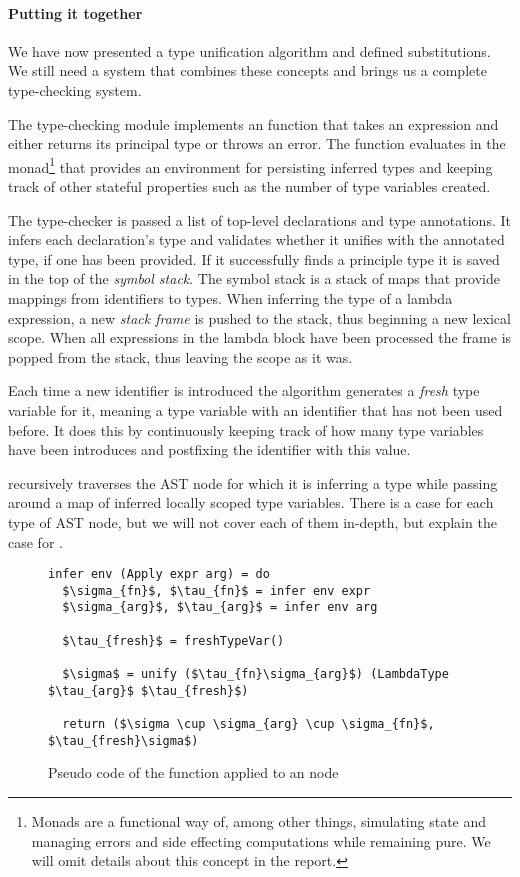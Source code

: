 \paragraph{Putting it together}
We have now presented a type unification algorithm and defined substitutions. We still need a system that combines these concepts and brings us a complete type-checking system.

The type-checking module  implements an  function that takes an expression and either returns its principal type or throws an error. The  function evaluates in the  monad\footnote{Monads are a functional way of, among other things, simulating state and managing errors and side effecting computations while remaining pure. We will omit details about this concept in the report.} that provides an environment for persisting inferred types and keeping track of other stateful properties such as the number of type variables created.

The type-checker is passed a list of top-level declarations and type annotations. It infers each declaration's type and validates whether it unifies with the annotated type, if one has been provided. If it successfully finds a principle type it is saved in the top of the \emph{symbol stack}. The symbol stack is a stack of maps that provide mappings from identifiers to types. When inferring the type of a lambda expression, a new \emph{stack frame} is pushed to the stack, thus beginning a new lexical scope. When all expressions in the lambda block have been processed the frame is popped from the stack, thus leaving the scope as it was.

Each time a new identifier is introduced the algorithm generates a \emph{fresh} type variable for it, meaning a type variable with an identifier that has not been used before. It does this by continuously keeping track of how many type variables have been introduces and postfixing the identifier with this value.

 recursively traverses the AST node for which it is inferring a type while passing around a map of inferred locally scoped type variables. There is a case for each type of AST node, but we will not cover each of them in-depth, but explain the case for .
\begin{figure}
\begin{lstlisting}[mathescape=true]
infer env (Apply expr arg) = do
  $\sigma_{fn}$, $\tau_{fn}$ = infer env expr
  $\sigma_{arg}$, $\tau_{arg}$ = infer env arg

  $\tau_{fresh}$ = freshTypeVar()

  $\sigma$ = unify ($\tau_{fn}\sigma_{arg}$) (LambdaType $\tau_{arg}$ $\tau_{fresh}$)

  return ($\sigma \cup \sigma_{arg} \cup \sigma_{fn}$, $\tau_{fresh}\sigma$)
\end{lstlisting}
\caption{Pseudo code of the  function applied to an  node}
\label{fig:infer-apply}
\end{figure}

